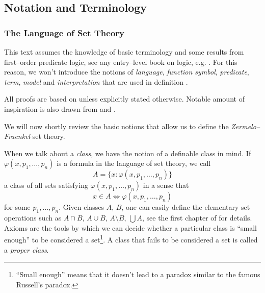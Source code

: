 \subsection{Notation and Terminology}
\subsubsection{The Language of Set Theory}
This text assumes the knowledge of basic terminology and some results from first–order predicate logic, see any entry–level book on logic, e.g. \cite{hamiltonBook}. For this reason, we won't introduce the notions of \emph{language}, \emph{function symbol}, \emph{predicate}, \emph{term}, \emph{model} and \emph{interpretation} that are used in definition .


All proofs are based on \cite{JechBook} unless explicitly stated otherwise. Notable amount of inspiration is also drawn from \cite{KanamoriBook} and \cite{DrakeBook}.

We will now shortly review the basic notions that allow us to define the \emph{Zermelo–Fraenkel} set theory.



When we talk about a \emph{class}, we have the notion of a definable class in mind. 
If $\varphi(x, p_1, \ldots, p_n)$ is a formula in the language of set theory, we call 
\begin{equation}
A = \{x : \varphi(x, p_1, \ldots, p_n)\}
\end{equation}
a class of all sets satisfying $\varphi(x, p_1, \ldots, p_n)$ in a sense that 
\begin{equation}
x \in A \iff \varphi(x, p_1, \ldots, p_n)
\end{equation}
for some $p_1, \ldots, p_n$. Given classes $A$, $B$, one can easily define the elementary set operations such as $A \cap B$, $A \cup B$, $A \setminus B$, $\bigcup A$, see the first chapter of \cite{JechBook} for details.
Axioms are the tools by which we can decide whether a particular class is ``small enough'' to be considered a set\footnote{``Small enough'' means that it doesn't lead to a paradox similar to the famous Russell's paradox.}. A class that fails to be considered a set is called a \emph{proper class}.

